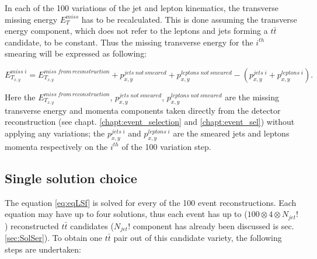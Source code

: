 In each of the 100 variations of the jet and lepton kinematics, the transverse missing energy $E_{T}^{miss}$ has to be recalculated. This is done
assuming the transverse energy component, which does not refer to the leptons and jets forming a $t\bar{t}$ candidate, to be constant. Thus the
missing transverse energy for the $i^{th}$ smearing will be expressed as following:

\begin{equation}\label{eq:weigh_av}
 E^{miss\;i}_{T_{x,y}} = E^{miss \; from \, reconstruction}_{T_{x,y}} + p^{jets \; not\,smeared}_{x,y} + p^{leptons\;not\,smeared}_{x,y} - (p^{jets\;i}_{x,y} + p^{leptons\;i}_{x,y}).
\end{equation}

Here the $E^{miss \; from \, reconstruction}_{T_{x,y}}$, $p^{jets \; not\,smeared}_{x,y}$, $p^{leptons\;not\,smeared}_{x,y}$ are the missing transverse energy and momenta
components taken directly from the detector reconstruction (see chapt. \ref{chapt:event_selection} and \ref{chapt:event_sel}) without applying any variations; the $p^{jets\;i}_{x,y}$ and $p^{leptons\;i}_{x,y}$
are the smeared jets and leptons momenta respectively on the $i^{th}$ of the 100 variation step.

\subsection{Single solution choice}

The equation \ref{eq:eqLSf} is solved for every of the 100 event reconstructions. Each equation may have up to four solutions, thus each event
has up to ($100 \otimes 4 \otimes N_{jet}!$) reconstructed $t\bar{t}$ candidates ($N_{jet}!$ component has already been discussed is sec. \ref{sec:SolSer}). 
To obtain one $t\bar{t}$ pair out of this candidate variety, the following steps are undertaken:

